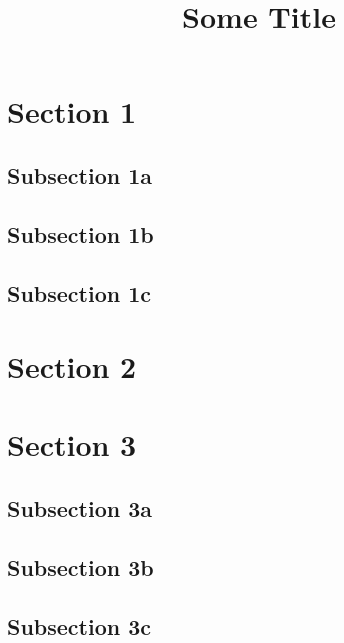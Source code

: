 \documentclass{beamer}
\title{Some Title}
\begin{document}
\begin{frame}
    \setcounter{secnumdepth}{-1}
  \tableofcontents[sectionstyle=hide/hide,subsectionstyle=hide/hide/hide]
\end{frame}

\section{Section 1}
\subsection{Subsection 1a}
\frame{}
\subsection{Subsection 1b}
\frame{}
\subsection{Subsection 1c}
\frame{}

\section{Section 2}
\frame{}

\section{Section 3}
\subsection{Subsection 3a}
\frame{}
\subsection{Subsection 3b}
\frame{}
\subsection{Subsection 3c}
\frame{}
\end{document}

